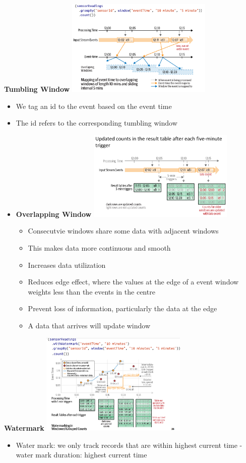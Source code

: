\documentclass[10pt, landscape]{article}
\begin{document}
\begin{multicols}{4}
\textbf{Tumbling Window}
\includegraphics*[width=7cm]{tumbling_window.png}
\begin{itemize}
  \item We tag an id to the event based on the event time 
  \item The id refers to the corresponding tumbling window
  \item \textbf{Overlapping Window}
  \includegraphics*[width=7cm]{tumbling_window2.png}
  \begin{itemize}
    \item Consecutvie windows share some data with adjacent windows 
    \item This makes data more continuous and smooth 
    \item Increases data utilization
    \item Reduces edge effect, where the values at the edge of a event window weights less than the events in the centre 
    \item Prevent loss of information, particularly the data at the edge 
    \item A data that arrives will update  window
  \end{itemize}
\end{itemize}

\textbf{Watermark}
\includegraphics*[width=7cm]{watermark.png}
\begin{itemize}
  \item Water mark: we only track records that are within highest current time - water mark duration: highest current time 
\end{itemize}


\end{multicols}
\end{document}
